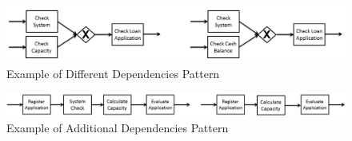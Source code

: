       \begin{figure}
      \centering
      \includegraphics[width=\textwidth]{3_background/mismatch-patterns-different-dependency}
      \caption{Example of Different Dependencies Pattern}
      \label{fig:different-dependency}
      \end{figure}
      \begin{figure}
      \centering
      \includegraphics[width=\textwidth]{3_background/mismatch-patterns-additional-dependency}
      \caption{Example of Additional Dependencies Pattern}
      \label{fig:additional-dependency}
      \end{figure}